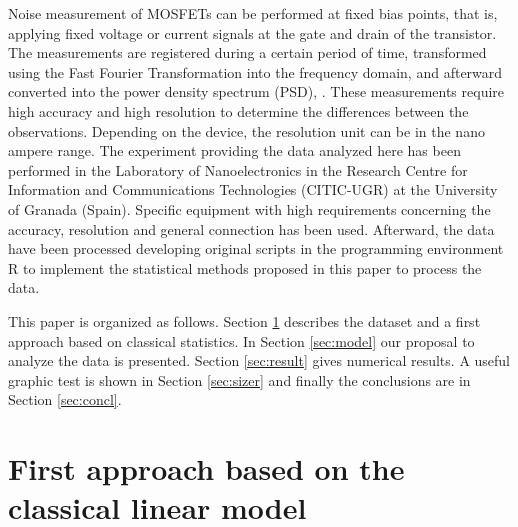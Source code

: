 \documentclass[sn-mathphys]{sn-jnl}%
\theoremstyle{thmstyleone}%
\theoremstyle{thmstyletwo}%
\theoremstyle{thmstylethree}%
\begin{document}
Noise measurement of MOSFETs can be performed at fixed bias points, that is, applying fixed voltage or current signals at the gate and drain of the transistor. The measurements are registered during  a certain period of time, transformed using the Fast Fourier Transformation into the frequency domain, and afterward converted into the power density spectrum (PSD), \cite{Duty2016}. These measurements require high accuracy and high resolution to determine the differences between the observations. Depending on the device, the resolution unit can be in the nano ampere range. The experiment providing the data analyzed here  has been performed in the Laboratory of Nanoelectronics in the Research Centre for Information and Communications Technologies (CITIC-UGR) at the University of Granada (Spain). Specific equipment with high requirements concerning the accuracy, resolution and general connection has been used. Afterward, the data have been processed developing original scripts in the programming environment R to implement the statistical methods proposed in this paper to process the data. \




This paper is organized as follows. Section \ref{sec:dataset} describes the dataset and a first approach based on classical statistics. In Section \ref{sec:model} our proposal to analyze the data is presented.  Section \ref{sec:result} gives numerical results. A useful graphic test is shown in Section \ref{sec:sizer} and finally the conclusions are in Section \ref{sec:concl}.

\section{First approach based on the classical linear model} \label{sec:dataset}
\end{document}
